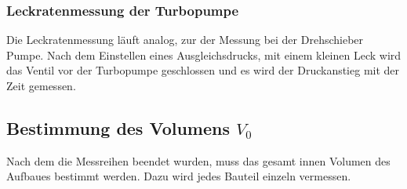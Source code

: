 \subsubsection{Leckratenmessung der Turbopumpe}
Die Leckratenmessung läuft analog, zur der Messung bei der Drehschieber Pumpe. Nach dem Einstellen eines Ausgleichsdrucks, mit einem kleinen Leck wird das Ventil vor der Turbopumpe geschlossen und es wird der Druckanstieg mit der Zeit gemessen.
\subsection{Bestimmung des Volumens $V_0$}
Nach dem die Messreihen beendet wurden, muss das gesamt innen Volumen des Aufbaues bestimmt werden. Dazu wird jedes Bauteil einzeln vermessen.